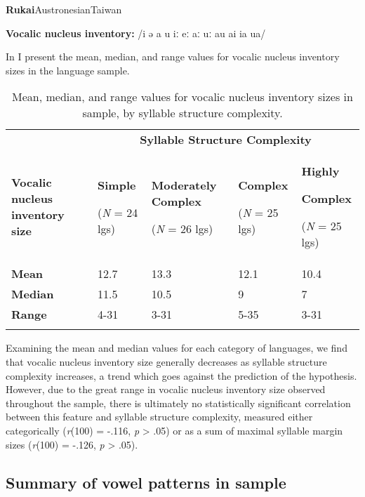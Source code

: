 \ea\label{ex:4.19}
 \textbf{Rukai}{Austronesian}{Taiwan}

\textbf{Vocalic nucleus inventory:} /i ə a u iː eː aː uː au ai ia ua/

  In  I present the mean, median, and range values for vocalic nucleus inventory sizes in the language sample.

\begin{table}
\begin{tabularx}{\textwidth}{XXXXX}
 & \multicolumn{4}{c}{ \textbf{Syllable Structure Complexity}}\\
\lsptoprule
\textbf{Vocalic nucleus inventory size} & { \textbf{Simple}}

 (\textit{N} = 24 lgs) & { \textbf{Moderately Complex}}

 (\textit{N} = 26 lgs) & { \textbf{Complex}}

 (\textit{N} = 25 lgs) & { \textbf{Highly} }

{ \textbf{Complex}}

 (\textit{N} = 25 lgs)\\
\textbf{Mean} & 12.7 & 13.3 & 12.1 & 10.4\\
\textbf{Median} & 11.5 & 10.5 & 9 & 7\\
\textbf{Range} & 4-31 & 3-31 & 5-35 & 3-31\\
\lspbottomrule
\end{tabularx}
\caption{\label{tab:4.7}Mean, median, and range values for vocalic nucleus inventory sizes in sample, by syllable structure complexity.}
\end{table}
\z

  Examining the mean and median values for each category of languages, we find that vocalic nucleus inventory size generally decreases as syllable structure complexity increases, a trend which goes against the prediction of the hypothesis. However, due to the great range in vocalic nucleus inventory size observed throughout the sample, there is ultimately no statistically significant correlation between this feature and syllable structure complexity, measured either categorically (\textit{r}(100) = -.116, \textit{p} > .05) or as a sum of maximal syllable margin sizes (\textit{r}(100) = -.126, \textit{p} > .05). 

\subsection{Summary of vowel patterns in sample}\label{sec:4.3.6}

